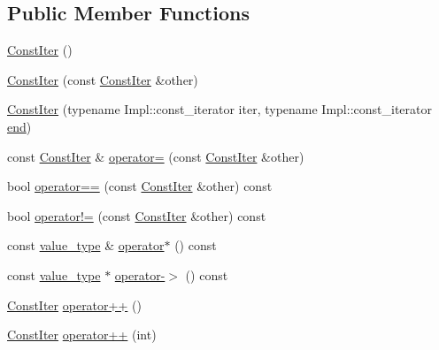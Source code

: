 \subsection*{Public Member Functions}
\begin{DoxyCompactItemize}
\item 
\hyperlink{classtheoria_1_1util_1_1densemap_1_1ConstIter_abd8d4df894cc2e37089ebe1a2bedd77d}{Const\+Iter} ()
\item 
\hyperlink{classtheoria_1_1util_1_1densemap_1_1ConstIter_a41f22939ee0096d9d395f211fa757726}{Const\+Iter} (const \hyperlink{classtheoria_1_1util_1_1densemap_1_1ConstIter}{Const\+Iter} \&other)
\item 
\hyperlink{classtheoria_1_1util_1_1densemap_1_1ConstIter_a393d12065a54dfadd07acb3268054695}{Const\+Iter} (typename Impl\+::const\+\_\+iterator iter, typename Impl\+::const\+\_\+iterator \hyperlink{classtheoria_1_1util_1_1densemap_a2aebd517ccb28817684c62afc67396f3}{end})
\item 
const \hyperlink{classtheoria_1_1util_1_1densemap_1_1ConstIter}{Const\+Iter} \& \hyperlink{classtheoria_1_1util_1_1densemap_1_1ConstIter_a8c7a0c2774a2d4cb22aa82f83585dd27}{operator=} (const \hyperlink{classtheoria_1_1util_1_1densemap_1_1ConstIter}{Const\+Iter} \&other)
\item 
bool \hyperlink{classtheoria_1_1util_1_1densemap_1_1ConstIter_a4fb1efa9f5b9594d3e05a00a04f4e774}{operator==} (const \hyperlink{classtheoria_1_1util_1_1densemap_1_1ConstIter}{Const\+Iter} \&other) const
\item 
bool \hyperlink{classtheoria_1_1util_1_1densemap_1_1ConstIter_a4ce33ebd18a5c6e3aca5efb4e3f83d81}{operator!=} (const \hyperlink{classtheoria_1_1util_1_1densemap_1_1ConstIter}{Const\+Iter} \&other) const
\item 
const \hyperlink{classtheoria_1_1util_1_1densemap_1_1ConstIter_a061fb76ecf5498d6033472fa66635d4a}{value\+\_\+type} \& \hyperlink{classtheoria_1_1util_1_1densemap_1_1ConstIter_ae0b3f11bfbeb4ef1335da2eb021d1de8}{operator$\ast$} () const
\item 
const \hyperlink{classtheoria_1_1util_1_1densemap_1_1ConstIter_a061fb76ecf5498d6033472fa66635d4a}{value\+\_\+type} $\ast$ \hyperlink{classtheoria_1_1util_1_1densemap_1_1ConstIter_a72db96ac5b14a045377b9b840a406d9a}{operator-\/$>$} () const
\item 
\hyperlink{classtheoria_1_1util_1_1densemap_1_1ConstIter}{Const\+Iter} \hyperlink{classtheoria_1_1util_1_1densemap_1_1ConstIter_a7dba18b534ffdf71354b4b5789aea3a1}{operator++} ()
\item 
\hyperlink{classtheoria_1_1util_1_1densemap_1_1ConstIter}{Const\+Iter} \hyperlink{classtheoria_1_1util_1_1densemap_1_1ConstIter_a8ca98e8a181d846c7c8412192f59da95}{operator++} (int)
\end{DoxyCompactItemize}


